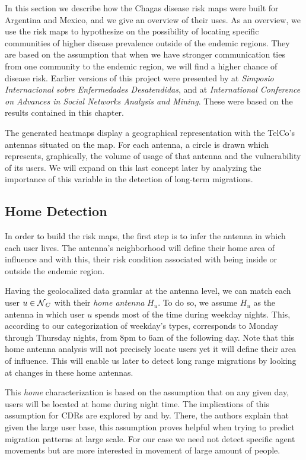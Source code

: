 In this section we describe how the Chagas disease risk maps were built for Argentina and Mexico, and we give an overview of their uses.
As an overview, we use the risk maps to hypothesize on the possibility of locating specific communities of higher disease prevalence outside of the endemic regions.
They are based on the assumption that when we have stronger communication ties from one community to the endemic region, we will find a higher chance of disease risk.
Earlier versions of this project were presented by \citep{sarraute2015descubriendo} at \emph{Simposio Internacional sobre Enfermedades Desatendidas}, and\citep{deMonasterio2016analyzing} at \emph{International Conference on Advances in Social Networks Analysis and Mining}.
These were based on the results contained in this chapter.

The generated heatmaps display a geographical representation with the TelCo's antennas situated on the map.
For each antenna, a circle is drawn which represents, graphically, the volume of usage of that antenna and the vulnerability of its users.
We will expand on this last concept later by analyzing the importance of this variable in the detection of long-term migrations.

\subsection{Home Detection}\label{subsection:home_detection}

In order to build the risk maps, the first step is to infer the antenna in which each user lives.
The antenna's neighborhood will define their home area of influence and with this, their risk condition associated with being inside or outside the endemic region.

Having the geolocalized data granular at the antenna level, we can match each user $u \in \operatorname{\mathcal{N}}_C$ with their \textit{home antenna} $H_u$.
To do so, we assume $H_u$ as the antenna in which user $u$ spends most of the time during weekday nights.
This, according to our categorization of weekday's types, corresponds to Monday through Thursday nights, from 8pm to 6am of the following day.
Note that this home antenna analysis will not precisely locate users yet it will define their area of influence.
This will enable us later to detect long range migrations by looking at changes in these home antennas.

This \textit{home} characterization is based on the assumption that on any given day, users will be located at home during night time.
The implications of this assumption for CDRs are explored by \citep{sarraute2015socialevents} and by\citep{csaji2012exploring}.
There, the authors explain that given the large user base, this assumption proves helpful when trying to predict migration patterns at large scale.
For our case we need not detect specific agent movements but are more interested in movement of large amount of people.

